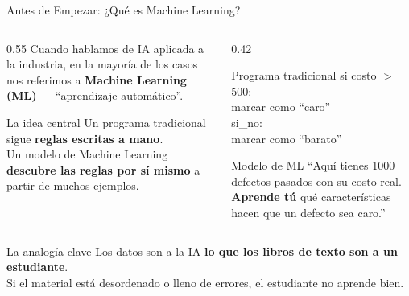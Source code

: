 \documentclass[aspectratio=169]{beamer}
\begin{document}
\begin{frame}{Antes de Empezar: ¿Qué es Machine Learning?}
  \begin{columns}[T]
    \begin{column}{0.55\textwidth}
      \small
      Cuando hablamos de IA aplicada a la industria, en la mayoría de los casos nos referimos a \textbf{Machine Learning (ML)} --- ``aprendizaje automático''.

      \vspace{0.2cm}
      \begin{conceptbox}{\faLightbulb\enspace La idea central}
        \small
        Un programa tradicional sigue \textbf{reglas escritas a mano}.\\[4pt]
        Un modelo de Machine Learning \textbf{descubre las reglas por sí mismo} a partir de muchos ejemplos.
      \end{conceptbox}
    \end{column}
    \begin{column}{0.42\textwidth}
      \begin{block}{\faCode\enspace Programa tradicional}
        \tiny\ttfamily
        si costo $>$ 500:\\
        \quad marcar como ``caro''\\
        si\_no:\\
        \quad marcar como ``barato''
      \end{block}
      \vspace{0.1cm}
      \begin{alertblock}{\faRobot\enspace Modelo de ML}
        \small
        ``Aquí tienes 1000 defectos pasados con su costo real. \textbf{Aprende tú} qué características hacen que un defecto sea caro.''
      \end{alertblock}
    \end{column}
  \end{columns}
  \vspace{0.2cm}
  \begin{conceptbox}{\faBookOpen\enspace La analogía clave}
    \centering\small
    Los datos son a la IA \textbf{lo que los libros de texto son a un estudiante}.\\
    Si el material está desordenado o lleno de errores, el estudiante no aprende bien.
  \end{conceptbox}
\end{frame}
\end{document}
